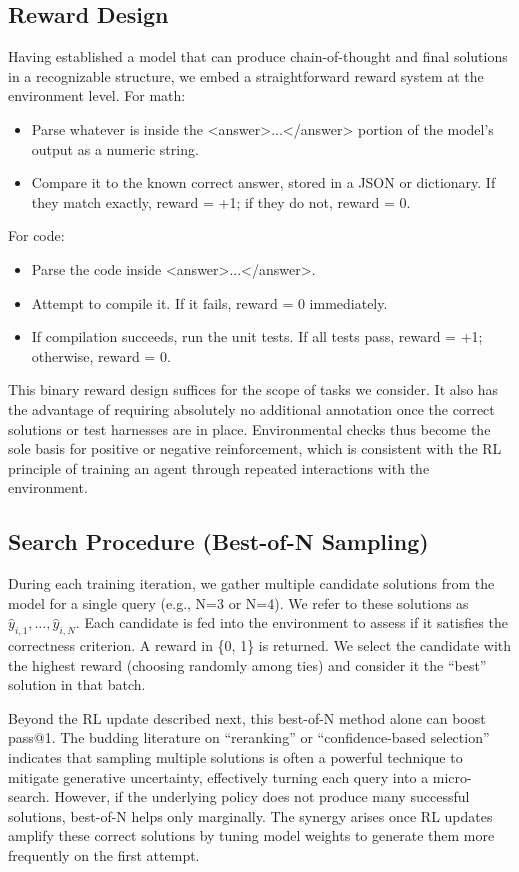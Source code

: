 \documentclass{article}
\begin{document}
\subsection{Reward Design}
Having established a model that can produce chain-of-thought and final solutions in a recognizable structure, we embed a straightforward reward system at the environment level. For math:
\begin{itemize}
\item Parse whatever is inside the <answer>...</answer> portion of the model’s output as a numeric string.
\item Compare it to the known correct answer, stored in a JSON or dictionary. If they match exactly, reward = +1; if they do not, reward = 0.
\end{itemize}

For code:
\begin{itemize}
\item Parse the code inside <answer>...</answer>.
\item Attempt to compile it. If it fails, reward = 0 immediately.
\item If compilation succeeds, run the unit tests. If all tests pass, reward = +1; otherwise, reward = 0.
\end{itemize}

This binary reward design suffices for the scope of tasks we consider. It also has the advantage of requiring absolutely no additional annotation once the correct solutions or test harnesses are in place. Environmental checks thus become the sole basis for positive or negative reinforcement, which is consistent with the RL principle of training an agent through repeated interactions with the environment.

\subsection{Search Procedure (Best-of-N Sampling)}
During each training iteration, we gather multiple candidate solutions from the model for a single query (e.g., N=3 or N=4). We refer to these solutions as \(\hat{y}_{i,1}, \dots, \hat{y}_{i,N}\). Each candidate is fed into the environment to assess if it satisfies the correctness criterion. A reward in \{0, 1\} is returned. We select the candidate with the highest reward (choosing randomly among ties) and consider it the “best” solution in that batch. 

Beyond the RL update described next, this best-of-N method alone can boost pass@1. The budding literature on “reranking” or “confidence-based selection” indicates that sampling multiple solutions is often a powerful technique to mitigate generative uncertainty, effectively turning each query into a micro-search. However, if the underlying policy does not produce many successful solutions, best-of-N helps only marginally. The synergy arises once RL updates amplify these correct solutions by tuning model weights to generate them more frequently on the first attempt.
\end{document}
